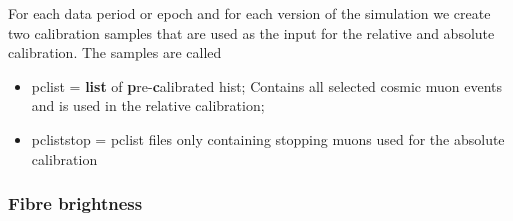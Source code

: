 \documentclass[12pt,a4paper]{article}
\begin{document}

For each data period or epoch and for each version of the simulation we create two calibration samples that are used as the input for the relative and absolute calibration. The samples are called \cite{NOVA-doc-13579-CalibrationMetaREADFIRST}
\begin{itemize}
\item pclist = \textbf{list} of \textbf{p}re-\textbf{c}alibrated hist; Contains all selected cosmic muon events and is used in the relative calibration;
\item pcliststop = pclist files only containing stopping muons used for the absolute calibration 
\end{itemize}

\subsubsection*{Fibre brightness}
\end{document}
